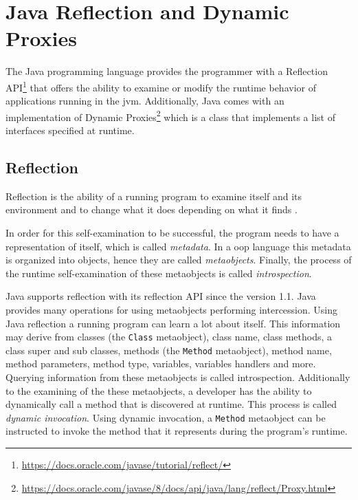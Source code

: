\section{Java Reflection and Dynamic Proxies}\label{Java Reflection and Dynamic Proxies}
The Java programming language provides the programmer with a Reflection API\footnote{\url{https://docs.oracle.com/javase/tutorial/reflect/}} that offers the ability to examine or modify the runtime behavior of applications running in the \ac{jvm}. 
Additionally, Java comes with an implementation of Dynamic Proxies\footnote{\url{https://docs.oracle.com/javase/8/docs/api/java/lang/reflect/Proxy.html}} which is a class that implements a list of interfaces specified at runtime.

\subsection{Reflection}\label{Reflection}

Reflection is the ability of a running program to examine itself and its environment and to change what it does depending on what it finds \cite{forman2004java}.

In order for this self-examination to be successful, the program needs to have a representation of itself, which is called \textit{metadata}.
In a \ac{oop} language this metadata is organized into objects, hence they are called \textit{metaobjects}. 
Finally, the process of the runtime self-examination of these metaobjects is called \textit{introspection}.

Java supports reflection with its reflection API since the version 1.1.
Java provides many operations for using metaobjects performing intercession.
Using Java reflection a running program can learn a lot about itself. 
This information may derive from classes (the \texttt{Class} metaobject), class name, class methods, a class super and sub classes, methods (the \texttt{Method} metaobject), method name, method parameters, method type, variables, variables handlers and more. 
Querying information from these metaobjects is called introspection.
Additionally to the examining of the these metaobjects, a developer has the ability to dynamically call a method that is discovered at runtime. 
This process is called \textit{dynamic invocation}. 
Using dynamic invocation, a \texttt{Method} metaobject can be instructed to invoke the method that it represents during the program's runtime. 

